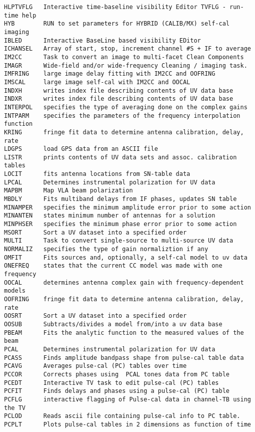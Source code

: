 \begin{verbatim}
HLPTVFLG   Interactive time-baseline visibility Editor TVFLG - run-time help
HYB        RUN to set parameters for HYBRID (CALIB/MX) self-cal imaging
IBLED      Interactive BaseLine based visibility EDitor
ICHANSEL   Array of start, stop, increment channel #S + IF to average
IM2CC      Task to convert an image to multi-facet Clean Components
IMAGR      Wide-field and/or wide-frequency Cleaning / imaging task.
IMFRING    large image delay fitting with IM2CC and OOFRING
IMSCAL     large image self-cal with IM2CC and OOCAL
INDXH      writes index file describing contents of UV data base
INDXR      writes index file describing contents of UV data base
INTERPOL   specifies the type of averaging done on the complex gains
INTPARM    specifies the parameters of the frequency interpolation function
KRING      fringe fit data to determine antenna calibration, delay, rate
LDGPS      load GPS data from an ASCII file
LISTR      prints contents of UV data sets and assoc. calibration tables
LOCIT      fits antenna locations from SN-table data
LPCAL      Determines instrumental polarization for UV data
MAPBM      Map VLA beam polarization
MBDLY      Fits multiband delays from IF phases, updates SN table
MINAMPER   specifies the minimum amplitude error prior to some action
MINANTEN   states minimum number of antennas for a solution
MINPHSER   specifies the minimum phase error prior to some action
MSORT      Sort a UV dataset into a specified order
MULTI      Task to convert single-source to multi-source UV data
NORMALIZ   specifies the type of gain normaliztion if any
OMFIT      Fits sources and, optionally, a self-cal model to uv data
ONEFREQ    states that the current CC model was made with one frequency
OOCAL      determines antenna complex gain with frequency-dependent models
OOFRING    fringe fit data to determine antenna calibration, delay, rate
OOSRT      Sort a UV dataset into a specified order
OOSUB      Subtracts/divides a model from/into a uv data base
PBEAM      Fits the analytic function to the measured values of the beam
PCAL       Determines instrumental polarization for UV data
PCASS      Finds amplitude bandpass shape from pulse-cal table data
PCAVG      Averages pulse-cal (PC) tables over time
PCCOR      Corrects phases using  PCAL tones data from PC table
PCEDT      Interactive TV task to edit pulse-cal (PC) tables
PCFIT      Finds delays and phases using a pulse-cal (PC) table
PCFLG      interactive flagging of Pulse-cal data in channel-TB using the TV
PCLOD      Reads ascii file containing pulse-cal info to PC table.
PCPLT      Plots pulse-cal tables in 2 dimensions as function of time

\end{verbatim}
